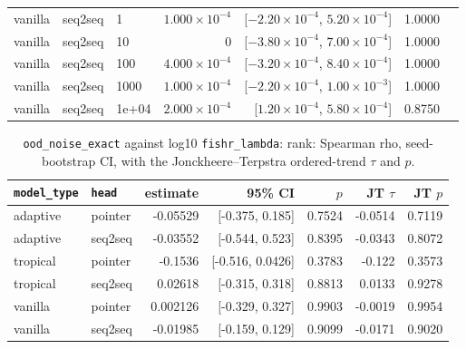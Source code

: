 \documentclass[10pt]{article}
\begin{document}
{\begin{longtable}{lllrrrl}
vanilla & seq2seq & 1 & $1.000\times10^{-4}$ & [$-2.20\times10^{-4}$, $5.20\times10^{-4}$] & 1.0000 & \\
vanilla & seq2seq & 10 & 0 & [$-3.80\times10^{-4}$, $7.00\times10^{-4}$] & 1.0000 & \\
vanilla & seq2seq & 100 & $4.000\times10^{-4}$ & [$-3.20\times10^{-4}$, $8.40\times10^{-4}$] & 1.0000 & \\
vanilla & seq2seq & 1000 & $1.000\times10^{-4}$ & [$-2.20\times10^{-4}$, $1.00\times10^{-3}$] & 1.0000 & \\
vanilla & seq2seq & 1e+04 & $2.000\times10^{-4}$ & [$1.20\times10^{-4}$, $5.80\times10^{-4}$] & 0.8750 & \\
\bottomrule
\end{longtable}
}

{\small
\begin{longtable}{llrrrrr}
\caption{\texttt{ood\_noise\_exact} against log10 \texttt{fishr\_lambda}: rank: Spearman rho, seed-bootstrap CI, with the Jonckheere--Terpstra ordered-trend $\tau$ and $p$.}\label{tab:trend-ood_noise_exact}\\
\toprule
\texttt{model\_type} & \texttt{head} & estimate & 95\% CI & $p$ & JT $\tau$ & JT $p$\\
\midrule
\endhead
adaptive & pointer & -0.05529 & [-0.375, 0.185] & 0.7524 & -0.0514 & 0.7119\\
adaptive & seq2seq & -0.03552 & [-0.544, 0.523] & 0.8395 & -0.0343 & 0.8072\\
tropical & pointer & -0.1536 & [-0.516, 0.0426] & 0.3783 & -0.122 & 0.3573\\
tropical & seq2seq & 0.02618 & [-0.315, 0.318] & 0.8813 & 0.0133 & 0.9278\\
vanilla & pointer & 0.002126 & [-0.329, 0.327] & 0.9903 & -0.0019 & 0.9954\\
vanilla & seq2seq & -0.01985 & [-0.159, 0.129] & 0.9099 & -0.0171 & 0.9020\\
\bottomrule
\end{longtable}
}
\end{document}
